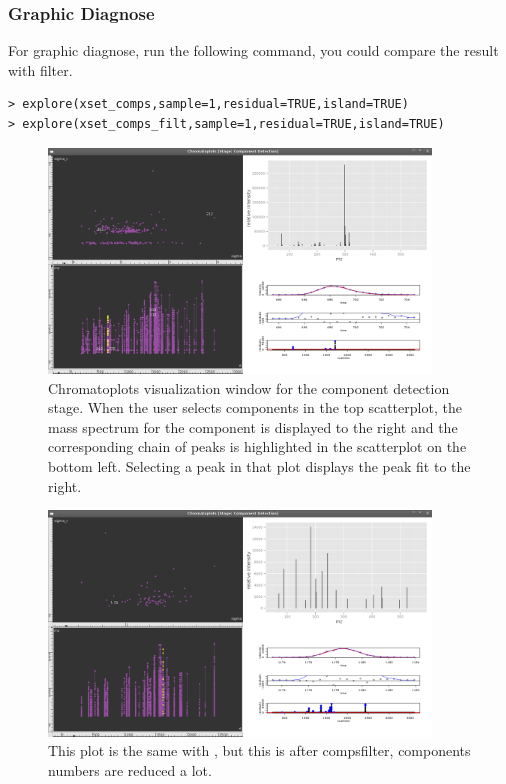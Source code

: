 \documentclass[11pt,a4paper]{article}
\begin{document}
\subsubsection*{Graphic Diagnose}
For graphic diagnose, run the following command, you could compare the
result with filter.
\begin{verbatim}
> explore(xset_comps,sample=1,residual=TRUE,island=TRUE)
> explore(xset_comps_filt,sample=1,residual=TRUE,island=TRUE)
\end{verbatim}
\begin{figure}[h!t!b!p]
\begin{center}
  \includegraphics[width=4in]{findcomps1.png}
  \caption{\label{fig:findcomps1}Chromatoplots visualization window
    for the component detection stage. When the user selects
    components in the top scatterplot, the mass spectrum for the
    component is displayed to the right and the corresponding chain of
    peaks is highlighted in the scatterplot on the bottom
    left. Selecting a peak in that plot displays the peak fit to the
    right.}
\end{center}
\end{figure}
\begin{figure}[h!t!b!p]
\begin{center}
  \includegraphics[width=4in]{findcomps2.png}
  \caption{\label{fig:findcomps2}This plot is the same with \label{fig:findcomps1},
but this is after compsfilter, components numbers are reduced a lot.}
\end{center}
\end{figure}
\end{document}
